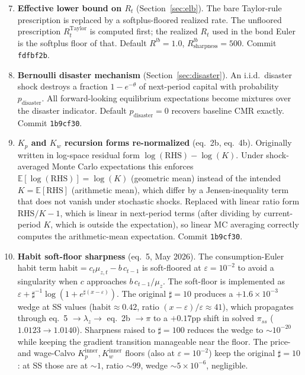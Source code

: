 \documentclass[11pt]{article}
\begin{document}
\begin{enumerate}
\setcounter{enumi}{6}
\item \textbf{Effective lower bound on $R_t$} (Section~\ref{sec:elb}).
  The bare Taylor-rule prescription is replaced by a softplus-floored
  realized rate. The unfloored prescription $R^{\text{Taylor}}_t$ is
  computed first; the realized $R_t$ used in the bond Euler is the
  softplus floor of that. Default $R^{lb} = 1.0$,
  $R^{lb}_{\text{sharpness}} = 500$. Commit \texttt{fdfbf2b}.

\item \textbf{Bernoulli disaster mechanism}
  (Section~\ref{sec:disaster}). An i.i.d.\ disaster shock destroys a
  fraction $1 - e^{-\theta}$ of next-period capital with probability
  $p_{\text{disaster}}$. All forward-looking equilibrium expectations
  become mixtures over the disaster indicator. Default
  $p_{\text{disaster}} = 0$ recovers baseline CMR exactly. Commit
  \texttt{1b9cf30}.

\item \textbf{$K_p$ and $K_w$ recursion forms re-normalized}
  (eq.~2b, eq.~4b). Originally written in log-space residual form
  $\log(\text{RHS}) - \log(K)$. Under shock-averaged Monte Carlo
  expectations this enforces $\mathbb{E}[\log(\text{RHS})] = \log(K)$
  (geometric mean) instead of the intended $K = \mathbb{E}[\text{RHS}]$
  (arithmetic mean), which differ by a Jensen-inequality term that does
  not vanish under stochastic shocks. Replaced with linear ratio form
  $\text{RHS}/K - 1$, which is linear in next-period terms (after
  dividing by current-period $K$, which is outside the expectation),
  so linear MC averaging correctly computes the arithmetic-mean
  expectation. Commit \texttt{1b9cf30}.

\item \textbf{Habit soft-floor sharpness}
  (eq.~5, May 2026). The consumption-Euler habit term
  $\text{habit} = c_t \mu_{z,t} - b\, c_{t-1}$ is soft-floored at
  $\varepsilon = 10^{-2}$ to avoid a singularity when $c$ approaches
  $b\,c_{t-1}/\mu_z$. The soft-floor is implemented as
  $\varepsilon + \sharp^{-1} \log(1 + e^{\sharp(x-\varepsilon)})$. The
  original $\sharp = 10$ produces a $+1.6\times 10^{-3}$ wedge at SS
  values ($\text{habit} \approx 0.42$, ratio $(x-\varepsilon)/\varepsilon
  \approx 41$), which propagates through eq.~5 $\to \lambda_z \to$
  eq.~2b $\to \pi$ to a $+0.17$pp shift in solved $\pi_{ss}$
  ($1.0123 \to 1.0140$). Sharpness raised to $\sharp = 100$ reduces the
  wedge to ${\sim}10^{-20}$ while keeping the gradient transition
  manageable near the floor. The price- and wage-Calvo
  $K_p^{\text{inner}}, K_w^{\text{inner}}$ floors (also at
  $\varepsilon = 10^{-2}$) keep the original $\sharp = 10$: at SS those
  are at $\sim\!1$, ratio $\sim\!99$, wedge ${\sim}5\times 10^{-6}$,
  negligible.


\end{enumerate}
\end{document}
